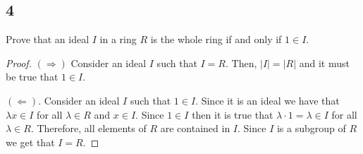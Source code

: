 \documentclass{article}
\newenvironment{hwproof}[1]
{
    #1
    \begin{proof}
}{
    \end{proof}
}
\begin{document}
\subsection*{4}
\begin{hwproof}
    {
        Prove that an ideal $I$ in a ring $R$ is the whole ring if and only
        if $1 \in I$.
    }
    $(\Rightarrow)$
    Consider an ideal $I$ such that $I = R$. Then, $|I| = |R|$ and it must be
    true that $1 \in I$.

    $(\Leftarrow)$.
    Consider an ideal $I$ such that $1 \in I$. Since it is an ideal we have that
    $\lambda x \in I$ for all $\lambda \in R$ and $x \in I$. Since $1 \in I$ then it is true
    that $\lambda \cdot 1 = \lambda \in I$ for all $\lambda \in R$. Therefore,
    all elements of $R$ are contained in $I$. Since $I$ is a subgroup of $R$
    we get that $I = R$.
\end{hwproof}
\end{document}
